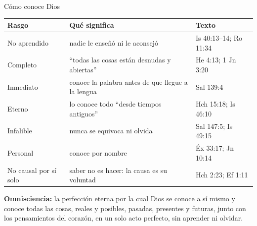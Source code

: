 \begin{frame}{Cómo conoce Dios}
\scriptsize\renewcommand{\arraystretch}{1.2}
\begin{tabular}{@{}>{\RaggedRight\arraybackslash}p{2.4cm}>{\RaggedRight\arraybackslash}p{6.0cm}>{\RaggedRight\arraybackslash}p{3.4cm}@{}}
\toprule
\textbf{Rasgo} & \textbf{Qué significa} & \textbf{Texto} \\ \midrule
No aprendido & nadie le enseñó ni le aconsejó & Is 40:13--14; Ro 11:34 \\
Completo & ``todas las cosas están desnudas y abiertas'' & He 4:13; 1 Jn 3:20 \\
Inmediato & conoce la palabra antes de que llegue a la lengua & Sal 139:4 \\
Eterno & lo conoce todo ``desde tiempos antiguos'' & Hch 15:18; Is 46:10 \\
Infalible & nunca se equivoca ni olvida & Sal 147:5; Is 49:15 \\
Personal & conoce por nombre & Éx 33:17; Jn 10:14 \\
No causal por sí solo & saber no es hacer: la causa es su voluntad & Hch 2:23; Ef 1:11 \\
\bottomrule
\end{tabular}\par\medskip
\begin{tcolorbox}[colback=papiro,colframe=azul,boxrule=1pt,arc=3pt]
\small\textbf{Omnisciencia:} la perfección eterna por la cual Dios se conoce a sí mismo y conoce todas las cosas, reales y posibles, pasadas, presentes y futuras, junto con los pensamientos del corazón, en un solo acto perfecto, sin aprender ni olvidar.
\end{tcolorbox}
\end{frame}

